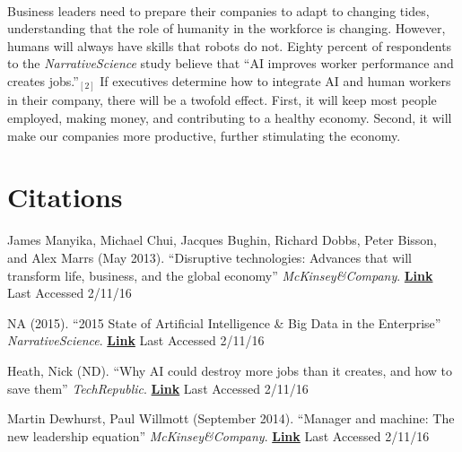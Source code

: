 \documentclass{article}
\begin{document}
    \paragraph{}
      Business leaders need to prepare their companies to adapt to
      changing tides, understanding that the role of humanity in the workforce
      is changing. However, humans will always have skills that robots do not.
      Eighty percent of respondents to the \textit{NarrativeScience} study believe
      that ``AI improves worker performance and creates jobs.''$_{[2]}$ If
      executives determine how to integrate AI and human workers in their company,
      there will be a twofold effect. First, it will keep
      most people employed, making money, and contributing to a healthy economy.
      Second, it will make our companies more productive, further stimulating the
      economy.

  \cleardoublepage

  \section{Citations}
    \begin{enumerate}[ {[}1{]} ]
      \item James Manyika, Michael Chui, Jacques Bughin, Richard Dobbs,
            Peter Bisson, and Alex Marrs (May 2013). ``Disruptive technologies:
            Advances that will transform life, business, and the global economy''
            \textit{McKinsey\&Company}.
            \href{http://www.mckinsey.com/insights/business_technology/disruptive_technologies}{\textbf{Link}}
            Last Accessed 2/11/16

      \item NA (2015). ``2015 State of Artificial Intelligence \& Big Data in
            the Enterprise'' \textit{NarrativeScience}.
            \href{https://www.narrativescience.com/filebin/images/Landing_Page/2015_State_of_AI_and_Big_Data_in_the_Enterprise.pdf}
                  {\textbf{Link}} Last Accessed 2/11/16

      \item Heath, Nick (ND). ``Why AI could destroy more jobs than it creates,
            and how to save them'' \textit{TechRepublic}.
            \href{http://www.techrepublic.com/article/ai-is-destroying-more-jobs-than-it-creates-what-it-means-and-how-we-can-stop-it/}
                 {\textbf{Link}} Last Accessed 2/11/16

      \item Martin Dewhurst, Paul Willmott (September 2014). ``Manager and
            machine: The new leadership equation'' \textit{McKinsey\&Company}.
            \href{http://www.mckinsey.com/insights/leading_in_the_21st_century/manager_and_machine}
                 {\textbf{Link}} Last Accessed 2/11/16


    \end{enumerate}

  
\end{document}
